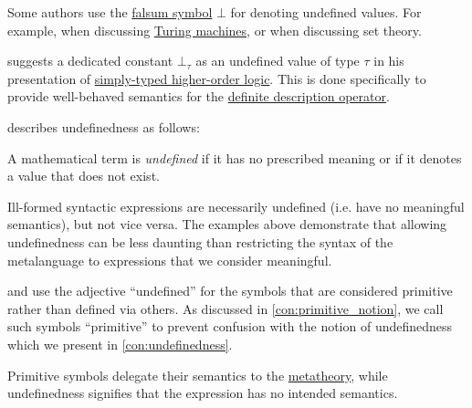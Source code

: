 \begin{comments}
  \item Some authors use the \hyperref[def:propositional_alphabet/constants/falsum]{falsum symbol} \( \bot \) for denoting undefined values. For example,  when discussing \hyperref[def:turing_machine]{Turing machines}, or  when discussing set theory.

   suggests a dedicated constant \( \bot_\tau \) as an undefined value of type \( \tau \) in his presentation of \hyperref[def:simply_typed_hol]{simply-typed higher-order logic}. This is done specifically to provide well-behaved semantics for the \hyperref[con:description_operator/iota]{definite description operator}.

  \item {} describes undefinedness as follows:
  \begin{displayquote}
    A mathematical term is \textit{undeﬁned} if it has no prescribed meaning or if it denotes a value that does not exist.
  \end{displayquote}

  \item Ill-formed syntactic expressions are necessarily undefined (i.e. have no meaningful semantics), but not vice versa. The examples above demonstrate that allowing undefinedness can be less daunting than restricting the syntax of the metalanguage to expressions that we consider meaningful.
\end{comments}

\begin{remark}\label{rem:undefined_and_primitive_terms}
   and  use the adjective \enquote{undefined} for the symbols that are considered primitive rather than defined via others. As discussed in \cref{con:primitive_notion}, we call such symbols \enquote{primitive} to prevent confusion with the notion of undefinedness which we present in \cref{con:undefinedness}.

  Primitive symbols delegate their semantics to the \hyperref[con:metalogic]{metatheory}, while undefinedness signifies that the expression has no intended semantics.
\end{remark}

